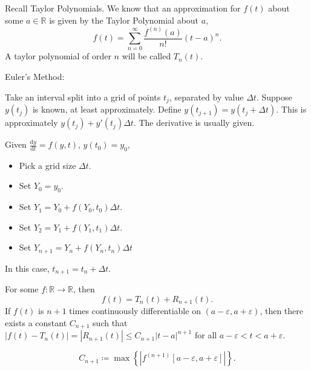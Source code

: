 Recall Taylor Polynomials. We know that an approximation for $f(t)$ about some $a\in\mathbb{R}$ is given by the Taylor Polynomial about $a$,
\[
	f(t)=\sum_{n=0}^{\infty} \frac{f^{(n)}(a)}{n!}(t-a)^n
.\]
A taylor polynomial of order $n$ will be called $T_n(t)$.
\begin{prev}
	Euler's Method:

	Take an interval split into a grid of points $t_j$, separated by value $\Delta t$. Suppose $y(t_j)$ is known, at least approximately. Define $y(t_{j+1})=y(t_j+\Delta t)$. This is approximately $y(t_j)+y'(t_j)\Delta t$. The derivative is usually given.

	Given $\frac{\mathrm{d}y}{\mathrm{d}t} =f(y,t)$, $y(t_0)=y_0$,
	\begin{itemize}
		\item Pick a grid size $\Delta t$.
		\item Set $Y_0=y_0$.
		\item Set $Y_1=Y_0+f(Y_0,t_0)\Delta t$.
		\item Set $Y_2=Y_1+f(Y_1,t_1)\Delta t$.
		\item Set $Y_{n+1}=Y_n+f(Y_n,t_n)\Delta t$
	\end{itemize}
	In this case, $t_{n+1}=t_n+\Delta t$.
\end{prev}
\begin{theorem}\label{thm:1}
	For some $f : \mathbb{R} \to \mathbb{R}$, then
	\[
		f(t)=T_n(t)+R_{n+1}(t)
	.\]
	If $f(t)$ is $n+1$ times continuously differentiable on $\left( a-\varepsilon  ,a+\varepsilon \right) $, then there exists a constant $C_{n+1}$ such that $|f(t)-T_n(t)|=\left| R_{n+1}(t) \right| \leq C_{n+1}\left| t-a \right| ^{n+1}$ for all $a-\varepsilon <t<a+\varepsilon $.

	\[C_{n+1}\coloneqq \max \left\{ \left| f^{(n+1)}[a-\varepsilon  ,a+\varepsilon ]  \right|\right\} .\]
\end{theorem}
